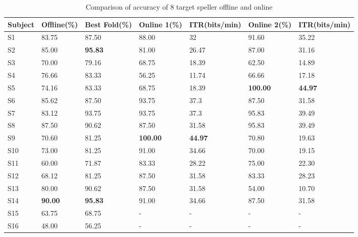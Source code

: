 \begin{table}[h]
\small
\caption{Comparison of accuracy of 8 target speller offline and online}
\label{tab:eight-target-comparison}
\begin{tabular}{@{}p{1.8cm}p{2cm}p{2cm}p{2.2cm}p{2cm}p{2.2cm}p{2cm}@{}}
\toprule
Subject & Offline(\%) & Best Fold(\%) & Online 1(\%) & ITR(bits/min) & Online 2(\%) & ITR(bits/min) \\ \midrule
S1      & 83.75       & 87.50        & 88.00        & 32             & 91.60        & 35.22 \\
S2      & 85.00       & \textbf{95.83}        & 81.00        & 26.47          & 87.00        & 31.16 \\
S3      & 70.00       & 79.16        & 68.75        & 18.39          & 62.50        & 14.89 \\
S4      & 76.66       & 83.33        & 56.25        & 11.74          & 66.66        & 17.18 \\
S5      & 74.16       & 83.33        & 68.75        & 18.39          & \textbf{100.00}       & \textbf{44.97} \\
S6      & 85.62       & 87.50        & 93.75        & 37.3           & 87.50        & 31.58 \\
S7      & 83.12       & 93.75        & 93.75        & 37.3           & 95.83        & 39.49 \\
S8      & 87.50       & 90.62        & 87.50        & 31.58          & 95.83        & 39.49 \\
S9      & 70.60       & 81.25        & \textbf{100.00}       & \textbf{44.97}          & 70.80        & 19.63 \\
S10     & 73.00       & 81.25        & 91.00        & 34.66          & 70.00        & 19.15 \\
S11     & 60.00       & 71.87        & 83.33        & 28.22          & 75.00        & 22.30 \\
S12     & 68.12       & 81.25        & 87.50        & 31.58          & 83.33        & 28.23 \\
S13     & 80.00       & 90.62        & 87.50        & 31.58          & 54.00        & 10.70 \\
S14     & \textbf{90.00}       & \textbf{95.83}        & 91.00        & 34.66          & 87.50        & 31.58 \\
\midrule
S15     & 63.75       & 68.75        & -             & -              & -             & - \\
S16     & 48.00       & 56.25        & -             & -              & -             & - \\

\end{tabular}
\end{table}
